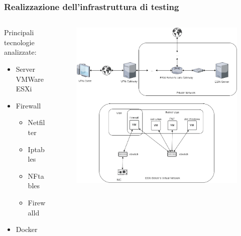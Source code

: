 \begin{frame}
    \frametitle{Realizzazione dell'infrastruttura di testing}
    \begin{columns}
        \begin{column}{0.5\textwidth}
            Principali tecnologie analizzate:
            \begin{itemize}
                \item Server VMWare ESXi
                \item Firewall
                      \begin{itemize}
                          \item Netfilter
                          \item Iptables
                          \item NFtables
                          \item Firewalld
                      \end{itemize}
                \item Docker
            \end{itemize}
        \end{column}
        \begin{column}{0.5\textwidth}
            \begin{figure}
                \centering
                \includegraphics[width=\textwidth]{res/fig/infrastruttura1.png}
            \end{figure}
        \end{column}
    \end{columns}
\end{frame}

